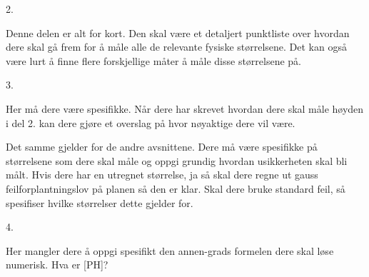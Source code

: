 2.

Denne delen er alt for kort. Den skal være et detaljert punktliste over hvordan dere skal gå frem for å måle alle de relevante fysiske størrelsene. Det kan også være lurt å finne flere forskjellige måter å måle disse størrelsene på.

3.

Her må dere være spesifikke. Når dere har skrevet hvordan dere skal måle høyden i del 2. kan dere gjøre et overslag på hvor nøyaktige dere vil være.

Det samme gjelder for de andre avsnittene. Dere må være spesifikke på størrelsene som dere skal måle og oppgi grundig hvordan usikkerheten skal bli målt. Hvis dere har en utregnet størrelse, ja så skal dere regne ut gauss feilforplantningslov på planen så den er klar. Skal dere bruke standard feil, så spesifiser hvilke størrelser dette gjelder for.

4. 

Her mangler dere å oppgi spesifikt den annen-grads formelen dere skal løse numerisk. Hva er [PH]?